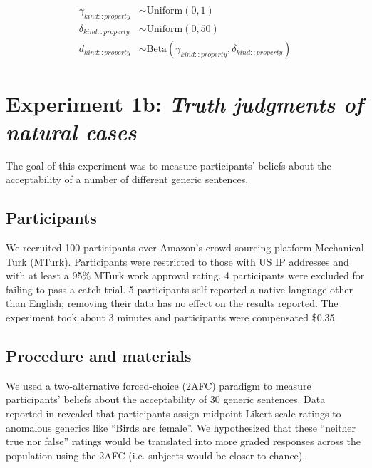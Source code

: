 \documentclass[10pt,letterpaper]{article}
\begin{document}
\begin{align*}
\gamma_{kind::property} & \sim \text{Uniform}(0, 1) \\
\delta_{kind::property} & \sim \text{Uniform}(0, 50) \\
d_{kind::property} & \sim \text{Beta}(\gamma_{kind::property}, \delta_{kind::property}) 
\end{align*}



\section{Experiment 1b: \emph{Truth judgments of natural cases}}
\label{truthjudements:naturalcases}

The goal of this experiment was to measure participants' beliefs about the acceptability of a number of different generic sentences. 

\subsection{Participants}

We recruited 100 participants over Amazon's crowd-sourcing platform Mechanical Turk (MTurk).  
Participants were restricted to those with US IP addresses and with at least a 95\% MTurk work approval rating. 
4 participants were excluded for failing to pass a catch trial.
5 participants self-reported a native language other than English; removing their data has no effect on the results reported. 
The experiment took about 3 minutes and participants were compensated \$0.35.

\subsection{Procedure and materials}

We used a two-alternative forced-choice (2AFC) paradigm to measure participants' beliefs about the acceptability of 30 generic sentences. 
Data reported in  revealed that participants assign midpoint Likert scale ratings to anomalous generics like ``Birds are female''. 
We hypothesized that these ``neither true nor false'' ratings would be translated into more graded responses across the population using the 2AFC (i.e. subjects would be closer to chance).
\end{document}
